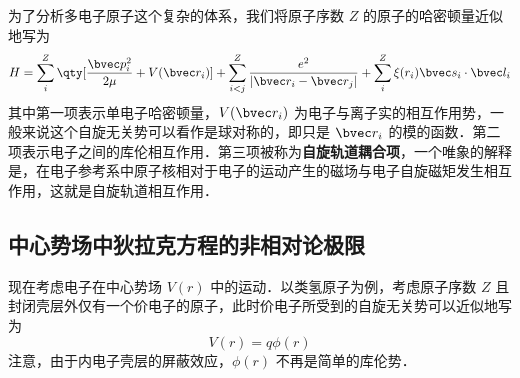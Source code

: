 
为了分析多电子原子这个复杂的体系，我们将原子序数 $Z$ 的原子的哈密顿量近似地写为
\begin{equation}
H=\sum_{i}^{Z} \qty[\frac{\bvec p_i^2}{2\mu} +V(\bvec r_i)]+\sum_{i<j}^Z \frac{e^2}{|\bvec r_i-\bvec r_j|}+\sum_i^Z \xi(r_i)\bvec s_i\cdot \bvec l_i
\end{equation}
其中第一项表示单电子哈密顿量，$V(\bvec r_i)$ 为电子与离子实的相互作用势，一般来说这个自旋无关势可以看作是球对称的，即只是 $\bvec r_i$ 的模的函数．第二项表示电子之间的库伦相互作用．第三项被称为\textbf{自旋轨道耦合项}，一个唯象的解释是，在电子参考系中原子核相对于电子的运动产生的磁场与电子自旋磁矩发生相互作用，这就是自旋轨道相互作用．
\subsection{中心势场中狄拉克方程的非相对论极限}
现在考虑电子在中心势场 $V(r)$ 中的运动．以类氢原子为例，考虑原子序数 $Z$ 且封闭壳层外仅有一个价电子的原子，此时价电子所受到的自旋无关势可以近似地写为
\begin{equation}
V(r)=q\phi(r)
\end{equation}
注意，由于内电子壳层的屏蔽效应，$\phi(r)$ 不再是简单的库伦势．